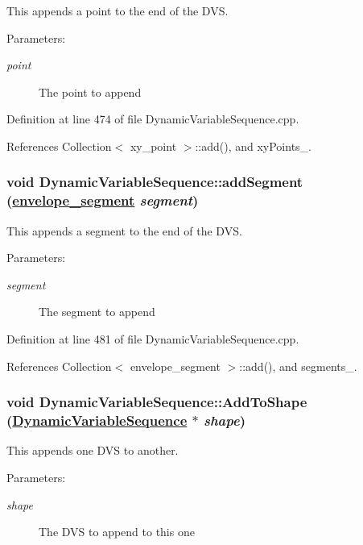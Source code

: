 This appends a point to the end of the DVS. \begin{Desc}
\item[Parameters:]
\begin{description}
\item[{\em point}]The point to append \end{description}
\end{Desc}


Definition at line 474 of file Dynamic\-Variable\-Sequence.cpp.

References Collection$<$ xy\_\-point $>$::add(), and xy\-Points\_\-.\hypertarget{classDynamicVariableSequence_a17}{
\subsubsection[addSegment]{\setlength{\rightskip}{0pt plus 5cm}void Dynamic\-Variable\-Sequence::add\-Segment (\hyperlink{structenvelope__segment}{envelope\_\-segment} {\em segment})}}
\label{classDynamicVariableSequence_a17}


This appends a segment to the end of the DVS. \begin{Desc}
\item[Parameters:]
\begin{description}
\item[{\em segment}]The segment to append \end{description}
\end{Desc}


Definition at line 481 of file Dynamic\-Variable\-Sequence.cpp.

References Collection$<$ envelope\_\-segment $>$::add(), and segments\_\-.\hypertarget{classDynamicVariableSequence_a9}{
\subsubsection[AddToShape]{\setlength{\rightskip}{0pt plus 5cm}void Dynamic\-Variable\-Sequence::Add\-To\-Shape (\hyperlink{classDynamicVariableSequence}{Dynamic\-Variable\-Sequence} $\ast$ {\em shape})}}
\label{classDynamicVariableSequence_a9}


This appends one DVS to another. \begin{Desc}
\item[Parameters:]
\begin{description}
\item[{\em shape}]The DVS to append to this one \end{description}
\end{Desc}


